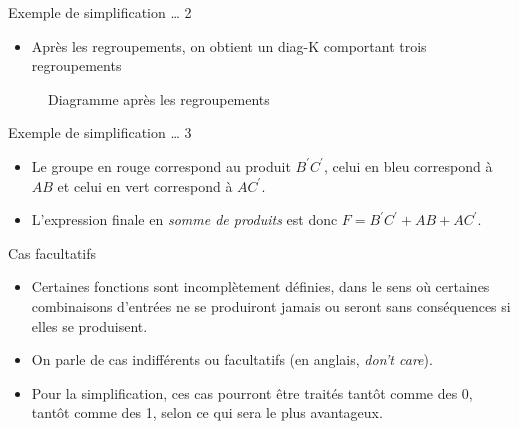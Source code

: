 \documentclass[presentation]{beamer}
\begin{document}
\begin{frame}[label={sec:orgf254e7d}]{Exemple de simplification \ldots{} 2}
\begin{itemize}
\item Après les regroupements, on obtient un diag-K comportant trois regroupements
\end{itemize}

\begin{figure}[htbp]
\centering

\caption{\label{fig:org7e8f48a}Diagramme après les regroupements}
\end{figure}
\end{frame}

\begin{frame}[label={sec:org3b52045}]{Exemple de simplification \ldots{} 3}
\begin{itemize}
\item Le groupe en rouge correspond au produit \(B^\prime C^\prime\), celui en bleu correspond à \(A B\) et celui en vert correspond à \(A C^\prime\).

\item L'expression finale en \emph{somme de produits} est donc \(F = B^\prime C^\prime + A B + A C^\prime\).
\end{itemize}
\end{frame}

\begin{frame}[label={sec:orgf59fe66}]{Cas facultatifs}
\begin{itemize}
\item Certaines fonctions sont incomplètement définies, dans le sens où certaines combinaisons d'entrées ne se produiront jamais ou seront sans conséquences si elles se produisent.

\item On parle de \alert{cas indifférents} ou \alert{facultatifs} (en anglais, \emph{don't care}).

\item Pour la simplification, ces cas pourront être traités tantôt comme des 0, tantôt comme des 1, selon ce qui sera le plus avantageux.
\end{itemize}
\end{frame}
\end{document}
